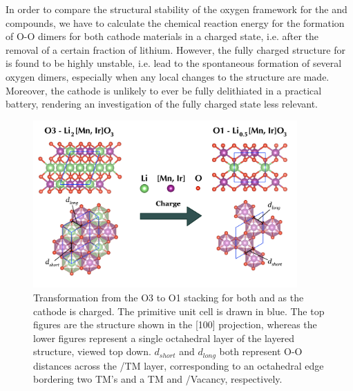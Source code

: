 \begin{refsection}

In order to compare the structural stability of the oxygen framework for the 
 and  compounds, we have to calculate the chemical 
reaction energy for the formation of O-O dimers for both cathode materials in 
a charged state, i.e. after the removal of a certain fraction of lithium. 
However, the fully charged structure for  is found to be highly 
unstable, i.e. lead to the spontaneous formation of several oxygen dimers, 
especially when any local changes to the structure are made. Moreover, the 
cathode is unlikely to ever be fully delithiated in a practical battery, 
rendering an investigation of the fully charged state less relevant. 

\begin{figure}[ht] 
\centering 
\captionsetup{width=0.9\linewidth}
\includegraphics[width=0.9\textwidth]{figures/batteries/structural_change.png} 
\caption{Transformation from the O3 to O1 stacking for both  and 
 as the cathode is charged. The primitive unit cell 
is drawn in blue. The top figures are the structure shown in the [100] 
projection, whereas the lower figures represent a single octahedral layer of 
the layered structure, viewed top down.  $d_{short}$ and $d_{long}$ both 
represent O-O distances across the /TM layer, corresponding to an 
octahedral edge bordering two TM's and a TM and /Vacancy, respectively.} 
\label{batteries:fig-structural_change} 
\end{figure} 


\end{refsection}
